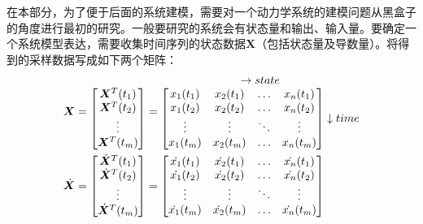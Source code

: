 在本部分，为了便于后面的系统建模，需要对一个动力学系统的建模问题从黑盒子的角度进行最初的研究。一般要研究的系统会有状态量和输出、输入量。要确定一个系统模型表达，需要收集时间序列的状态数据$\bm{X}$（包括状态量及导数量）。将得到的采样数据写成如下两个矩阵\cite{brunton2016discovering}：
\begin{equation}
\label{eq:chap3:1}
\begin{aligned}
\bm{X} &= \begin{matrix}
\\
\begin{bmatrix}
 \small \bm{X}^T(t_1)     \\
 \small \bm{X}^T(t_2)     \\
 \small \vdots            \\
 \small \bm{X}^T(t_{m})   \\
\end{bmatrix}
 \end{matrix}
= \begin{matrix}
  \rightarrow {state}  \\
  \begin{bmatrix}
   x_1(t_1) & x_2(t_1) & \ldots & x_n(t_1) \\
   x_1(t_2) & x_2(t_2) & \ldots & x_n(t_2) \\
   \vdots   & \vdots   & \ddots & \vdots   \\
   x_1(t_m) & x_2(t_m) & \ldots & x_n(t_m) \\
  \end{bmatrix}
  \downarrow time \\
 \end{matrix}
\\
\dot {\bm{X}} &=
\begin{bmatrix}
 \small \dot {\bm{X}}^T (t_1)     \\
 \small \dot {\bm{X}}^T(t_2)      \\
 \small \vdots                 \\
 \small \dot {\bm{X}}^T(t_{m}) \\
\end{bmatrix}
= \begin{bmatrix}
   \dot{x_1}(t_1)  &  \dot{x_2}(t_1) & \ldots & \dot{x_n}(t_1) \\
   \dot{x_1}(t_2)  &  \dot{x_2}(t_2) & \ldots & \dot{x_n}(t_2) \\
   \vdots          &  \vdots         & \ddots & \vdots         \\
   \dot{x_1}(t_m)  &  \dot{x_2}(t_m) & \ldots & \dot{x_n}(t_m) \\
  \end{bmatrix}
\end{aligned}
\end{equation}

